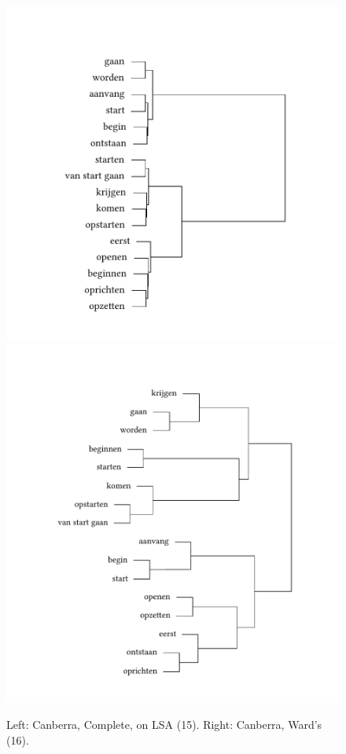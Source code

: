 \begin{figure}
\includegraphics[width=.48\textwidth,trim=95 40 75 75]{figures/tree44.pdf}\hfill%
\includegraphics[width=.48\textwidth,trim=95 40 75 75]{figures/tree45.pdf}
\caption{\label{fig:3:44}Left: Canberra, Complete, on LSA (15). Right:\label{fig:3:45} Canberra, Ward’s (16).}
\end{figure}

